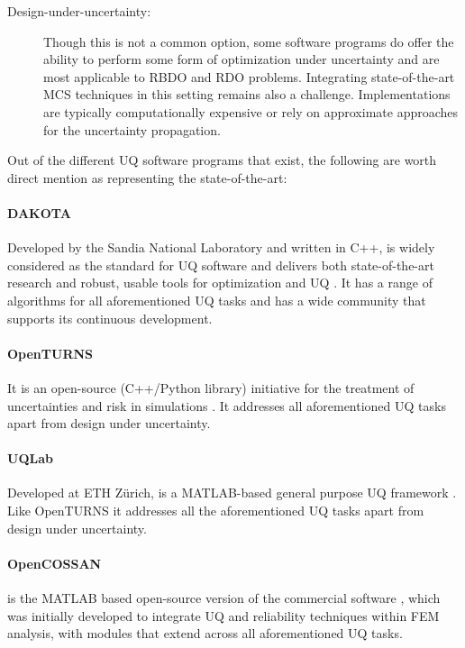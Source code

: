 \begin{description}
    \item[Design-under-uncertainty:]{Though this is not a common option, some software programs do offer the ability to perform some form of optimization under uncertainty and are most applicable to RBDO and RDO problems. Integrating state-of-the-art MCS techniques in this setting remains also a challenge. Implementations are typically computationally expensive or rely on approximate approaches for the uncertainty propagation.}
\end{description}

\noindent Out of the different UQ software programs that exist, the following are worth direct mention as representing the state-of-the-art: 

\paragraph{DAKOTA} Developed by the Sandia National Laboratory and written in C++,  is widely considered as the standard for UQ software and delivers both state-of-the-art research and robust, usable tools for optimization and UQ \citep{adams2009dakota}. It has a range of algorithms for all aforementioned UQ tasks and has a wide community that supports its continuous development. 

\paragraph{OpenTURNS} It is an open-source (C++/Python library) initiative for the treatment of uncertainties and risk in simulations \citep{andrianov2007open}. It addresses all aforementioned UQ tasks apart from design under uncertainty. 

\paragraph{UQLab} Developed at ETH Zürich,  is a MATLAB-based general purpose UQ framework \citep{marelli2014uqlab}. Like OpenTURNS it addresses all the aforementioned UQ tasks apart from design under uncertainty. 

\paragraph{OpenCOSSAN} 
 is the MATLAB based open-source version of the commercial software  \citep{patelli2017cossan}, which was initially developed to integrate UQ and reliability techniques within FEM analysis, with modules that extend across all aforementioned UQ tasks.

